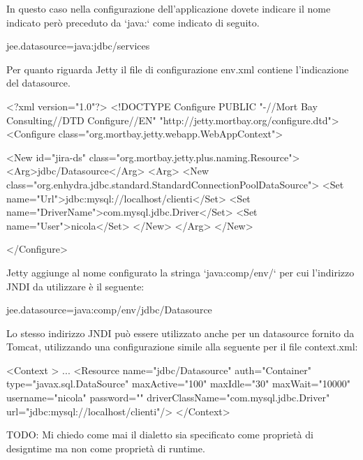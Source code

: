 In questo caso nella configurazione dell'applicazione dovete indicare il nome indicato però preceduto da `java:` come indicato di seguito.

\begin{bash}
jee.datasource=java:jdbc/services
\end{bash}


Per quanto riguarda Jetty il file di configurazione env.xml contiene l'indicazione del datasource.

\begin{xml}
<?xml version="1.0"?>
<!DOCTYPE Configure PUBLIC "-//Mort Bay Consulting//DTD Configure//EN" "http://jetty.mortbay.org/configure.dtd">
<Configure class="org.mortbay.jetty.webapp.WebAppContext">

  <New id="jira-ds" class="org.mortbay.jetty.plus.naming.Resource">
     <Arg>jdbc/Datasource</Arg>
       <Arg>
         <New class="org.enhydra.jdbc.standard.StandardConnectionPoolDataSource">
           <Set name="Url">jdbc:mysql://localhost/clienti</Set>
           <Set name="DriverName">com.mysql.jdbc.Driver</Set>
           <Set name="User">nicola</Set>
         </New>
      </Arg>
  </New>

</Configure>

\end{xml}

Jetty aggiunge al nome configurato la stringa `java:comp/env/` per cui l'indirizzo JNDI da utilizzare è il seguente:

\begin{bash}
jee.datasource=java:comp/env/jdbc/Datasource
\end{bash}

Lo stesso indirizzo JNDI può essere utilizzato anche per un datasource fornito da Tomcat, utilizzando una configurazione simile alla seguente per il file context.xml:

\begin{xml}
<Context >
  ...
  <Resource name="jdbc/Datasource" auth="Container" type="javax.sql.DataSource"
            maxActive="100" maxIdle="30" maxWait="10000"
            username="nicola" password="" driverClassName="com.mysql.jdbc.Driver"
            url="jdbc:mysql://localhost/clienti"/>
</Context>
\end{xml}

TODO: Mi chiedo come mai il dialetto sia specificato come proprietà di designtime ma non come proprietà di runtime.



